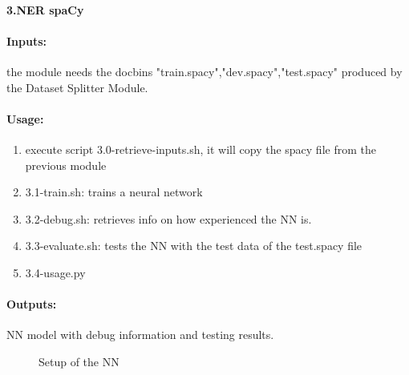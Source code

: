\documentclass[12pt,leqno]{amsart}
\begin{document}
\newpage
\paragraph{\textbf{3.NER spaCy}}
\paragraph{\textbf{Inputs: }}the module needs the docbins "train.spacy","dev.spacy","test.spacy" produced by the Dataset Splitter Module.
\paragraph{\textbf{Usage: }}
\begin{enumerate}
\item execute script 3.0-retrieve-inputs.sh, it will copy the spacy file from the previous module 
\item 3.1-train.sh: trains a neural network
\item 3.2-debug.sh: retrieves info on how experienced the NN is.
\item 3.3-evaluate.sh: tests the NN with the test data of the test.spacy file
\item 3.4-usage.py
\end{enumerate}
\paragraph{\textbf{Outputs: }}
NN model with debug information and testing results.
\begin{figure}[ht] %
    \caption{Setup of the NN} %
    \end{figure}
\end{document}
